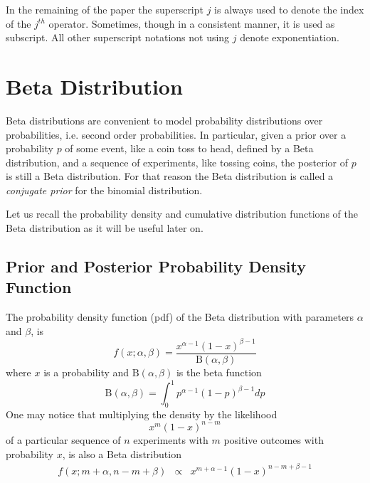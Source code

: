 \documentclass[runningheads]{llncs}
\begin{document}
\begin{remark}
In the remaining of the paper the superscript $j$ is always used to
denote the index of the $j^{th}$ operator. Sometimes, though in a
consistent manner, it is used as subscript. All other superscript
notations not using $j$ denote exponentiation.
\end{remark}

\section{Beta Distribution}
\label{beta}

Beta distributions \cite{Abourizk94Fitting} are convenient to model
probability distributions over probabilities, i.e. second order
probabilities. In particular, given a prior over a probability $p$ of
some event, like a coin toss to head, defined by a Beta distribution,
and a sequence of experiments, like tossing coins, the posterior of
$p$ is still a Beta distribution. For that reason the Beta
distribution is called a \emph{conjugate prior} for the binomial
distribution.

Let us recall the probability density and cumulative distribution
functions of the Beta distribution as it will be useful later on.
\subsection{Prior and Posterior Probability Density Function}
The probability density function (pdf) of the Beta distribution with
parameters $\alpha$ and $\beta$, is
\begin{equation}
  \label{beta-pdf}
f(x; \alpha, \beta) = \frac{x^{\alpha - 1} (1-x)^{\beta - 1}}
                           {\mathrm{B}(\alpha, \beta)}
\end{equation}
where $x$ is a probability and $\mathrm{B}(\alpha, \beta)$ is the beta
function
\begin{equation}
\mathrm{B}(\alpha, \beta) = \int_0^1 p^{\alpha - 1}(1-p)^{\beta - 1}
dp
\end{equation}
One may notice that multiplying the density by the likelihood
\begin{equation}
x^m (1-x)^{n-m}
\end{equation}
of a particular sequence of $n$ experiments with $m$ positive outcomes
with probability $x$, is also a Beta distribution
\begin{eqnarray}
  f(x; m+\alpha, n-m+\beta) & \propto & x^{m+\alpha - 1}
                                        (1-x)^{n-m+\beta - 1}
\end{eqnarray}
\end{document}
